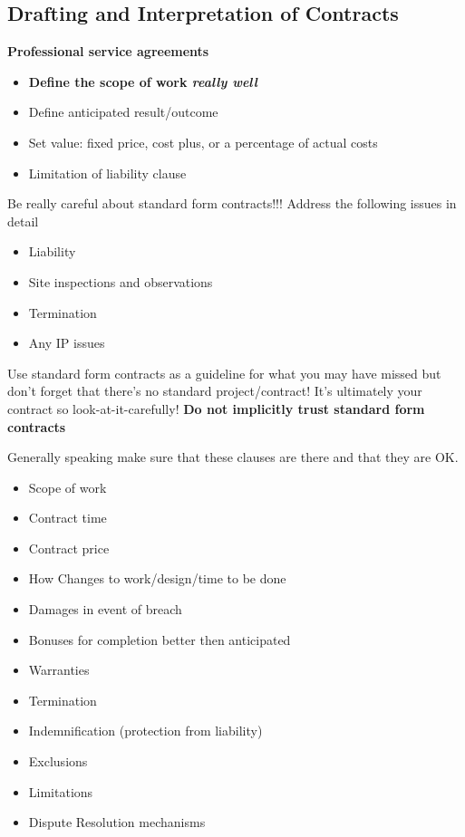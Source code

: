 \documentclass[10pt]{article}
\begin{document}
\subsection{Drafting and Interpretation of Contracts}

\begin{blockquote}
	\textbf{Professional service agreements} 
	\begin{itemize}
		\item \textbf{Define the scope of work \textit{really well}} 
		\item Define anticipated result/outcome
		\item Set value: fixed price, cost plus, or a percentage of actual costs
		\item Limitation of liability clause
	\end{itemize}
\end{blockquote}

Be really careful about standard form contracts!!! Address the following issues in detail
\begin{itemize}
	\item Liability
	\item Site inspections and observations
	\item Termination
	\item Any IP issues
\end{itemize}

Use standard form contracts as a guideline for what you may have missed but don't forget that there's no standard project/contract! It's ultimately your contract so look-at-it-carefully! \textbf{Do not implicitly trust standard form contracts} 


Generally speaking make sure that these clauses are there and that they are OK.

\begin{itemize}
	\item Scope of work
	\item Contract time
	\item Contract price
	\item How Changes to work/design/time to be done
	\item Damages in event of breach
	\item Bonuses for completion better then anticipated
	\item Warranties
	\item Termination 
	\item Indemnification (protection from liability)
	\item Exclusions 
	\item Limitations
	\item Dispute Resolution mechanisms
\end{itemize}
\end{document}

